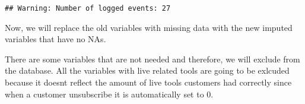 \documentclass[]{article}
\newenvironment{Shaded}{\begin{snugshade}}{\end{snugshade}}
\newcommand{\KeywordTok}[1]{\textcolor[rgb]{0.13,0.29,0.53}{\textbf{#1}}}
\newcommand{\StringTok}[1]{\textcolor[rgb]{0.31,0.60,0.02}{#1}}
\newcommand{\OperatorTok}[1]{\textcolor[rgb]{0.81,0.36,0.00}{\textbf{#1}}}
\newcommand{\NormalTok}[1]{#1}
\begin{document}
\begin{verbatim}
## Warning: Number of logged events: 27
\end{verbatim}

Now, we will replace the old variables with missing data with the new
imputed variables that have no NAs.

\begin{Shaded}
\end{Shaded}

There are some variables that are not needed and therefore, we will
exclude from the database. All the variables with live related tools are
going to be exlcuded because it doesnt reflect the amount of live tools
customers had correctly since when a customer unsubscribe it is
automatically set to 0.

\begin{Shaded}
\end{Shaded}
\end{document}
